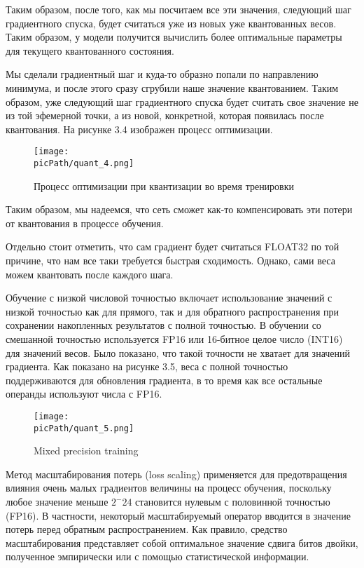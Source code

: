 \documentclass[oneside,final,12pt]{extreport}
\newcommand{\picPath}{images}
\begin{document}
Таким образом, после того, как мы посчитаем все эти значения, следующий шаг градиентного спуска, будет считаться уже из новых уже квантованных весов. Таким образом, у модели получится вычислить более оптимальные параметры для текущего квантованного состояния.

Мы сделали градиентный шаг и куда-то образно попали по направлению минимума, и после этого сразу сгрубили наше значение квантованием. Таким образом, уже следующий шаг градиентного спуска будет считать свое значение не из той эфемерной точки, а из новой, конкретной, которая появилась после квантования. На рисунке 3.4 изображен процесс оптимизации.

\begin{figure}[H]
\begin{center}
  \texttt{[image: \\picPath/quant\_4.png]}
  \caption{Процесс оптимизации при квантизации во время тренировки}
  \label{fig:quant_4}
  \end{center}
\end{figure}

Таким образом, мы надеемся, что сеть сможет как-то компенсировать эти потери от квантования в процессе обучения.

Отдельно стоит отметить, что сам градиент будет считаться FLOAT32 по той причине, что нам все таки требуется быстрая сходимость. Однако, сами веса можем квантовать после каждого шага. 

Обучение с низкой числовой точностью включает использование значений с низкой точностью как для прямого, так и для обратного распространения при сохранении накопленных результатов с полной точностью. В обучении со смешанной точностью используется FP16 или 16-битное целое число (INT16) для значений весов. Было показано, что такой точности не хватает для значений градиента. Как показано на рисунке 3.5, веса с полной точностью поддерживаются для обновления градиента, в то время как все остальные операнды используют числа с FP16.
\begin{figure}[H]
\begin{center}
  \texttt{[image: \\picPath/quant\_5.png]}
  \caption{Mixed precision training}
  \label{fig:quant_5}
  \end{center}
\end{figure}

Метод масштабирования потерь (loss scaling) применяется для предотвращения влияния очень малых градиентов величины на процесс обучения, поскольку любое значение меньше $2 ^ -24$ становится нулевым с половинной точностью (FP16). В частности, некоторый масштабируемый оператор вводится в значение потерь перед обратным распространением. Как правило, средство масштабирования представляет собой оптимальное значение сдвига битов двойки, полученное эмпирически или с помощью статистической информации.
\end{document}
